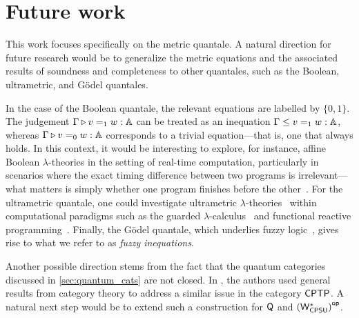 \chapter{Future work}\label{ch:future_work}


This work focuses specifically on the metric quantale. A natural direction for future research would be to generalize the metric equations and the associated results of soundness and completeness to other quantales, such as the Boolean, ultrametric, and Gödel quantales.

In the case of the Boolean quantale, the relevant equations are labelled by $\{0,1\}$. The judgement $\Gamma \triangleright v =_{1} w : \mathbb{A}$ can be  treated as an inequation $\Gamma \leq v =_{1} w : \mathbb{A}$, whereas $\Gamma \triangleright v =_{0} w : \mathbb{A}$ corresponds to a trivial equation---that is, one that always holds. In this context, it would be interesting to explore, for instance, affine Boolean $\lambda$-theories in the setting of real-time computation, particularly in scenarios where the exact timing difference between two programs is irrelevant---what matters is simply whether one program finishes before the other~\cite{dahlqvist2023syntactic}. For the ultrametric quantale, one could investigate ultrametric $\lambda$-theories~\cite{dahlqvist2023syntactic} within computational paradigms such as the guarded $\lambda$-calculus~\cite{guarded_ultrametric} and functional reactive programming~\cite{Ultrametric_reactive}. Finally, the Gödel quantale, which underlies fuzzy logic~\cite{deneckeGaloisConnectionsApplications2004}, gives rise to what we refer to as \emph{fuzzy inequations}.









Another possible direction stems from the fact that the quantum categories discussed in \autoref{sec:quantum_cats} are not closed. In \cite{dahlqvist2023syntactic}, the authors used general results from category theory to address a similar issue in the category $\mathsf{CPTP}$. A natural next step would be to extend such a construction for $\mathsf{Q}$ and $\left(\mathsf{W^*_{CPSU}}\right)^{\mathsf{op}}$.


